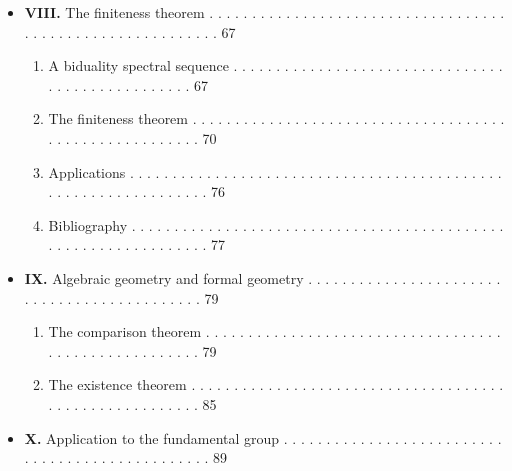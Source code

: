 \documentclass[
]{article}
\providecommand{\tightlist}{%
  \setlength{\itemsep}{0pt}\setlength{\parskip}{0pt}}
\begin{document}
\begin{itemize}
  \begin{enumerate}
  \def\labelenumi{\arabic{enumi}.}
  \tightlist
  \item
    Study for \(i < n\) . . . . . . . . . . . . . . . . . . . . . . . .
    . . . . . . . . . . . . . . . . . . . . . . . . . . . . . . . . . .
    . . 61
  \item
    Study for \(i > n\) . . . . . . . . . . . . . . . . . . . . . . . .
    . . . . . . . . . . . . . . . . . . . . . . . . . . . . . . . . . .
    . . 64
  \end{enumerate}
\item
  \textbf{VIII.} The finiteness theorem . . . . . . . . . . . . . . . .
  . . . . . . . . . . . . . . . . . . . . . . . . . . . . . . . . . . .
  . . . . . . . 67

  \begin{enumerate}
  \def\labelenumi{\arabic{enumi}.}
  \tightlist
  \item
    A biduality spectral sequence . . . . . . . . . . . . . . . . . . .
    . . . . . . . . . . . . . . . . . . . . . . . . . . . . . . 67
  \item
    The finiteness theorem . . . . . . . . . . . . . . . . . . . . . . .
    . . . . . . . . . . . . . . . . . . . . . . . . . . . . . . . . 70
  \item
    Applications . . . . . . . . . . . . . . . . . . . . . . . . . . . .
    . . . . . . . . . . . . . . . . . . . . . . . . . . . . . . . . . .
    . 76
  \item
    Bibliography . . . . . . . . . . . . . . . . . . . . . . . . . . . .
    . . . . . . . . . . . . . . . . . . . . . . . . . . . . . . . . . .
    . 77
  \end{enumerate}
\item
  \textbf{IX.} Algebraic geometry and formal geometry . . . . . . . . .
  . . . . . . . . . . . . . . . . . . . . . . . . . . . . . . . . . . .
  79

  \begin{enumerate}
  \def\labelenumi{\arabic{enumi}.}
  \tightlist
  \item
    The comparison theorem . . . . . . . . . . . . . . . . . . . . . . .
    . . . . . . . . . . . . . . . . . . . . . . . . . . . . . . 79
  \item
    The existence theorem . . . . . . . . . . . . . . . . . . . . . . .
    . . . . . . . . . . . . . . . . . . . . . . . . . . . . . . . . 85
  \end{enumerate}
\item
  \textbf{X.} Application to the fundamental group . . . . . . . . . . .
  . . . . . . . . . . . . . . . . . . . . . . . . . . . . . . . . . . .
  . . 89


\end{itemize}
\end{document}

